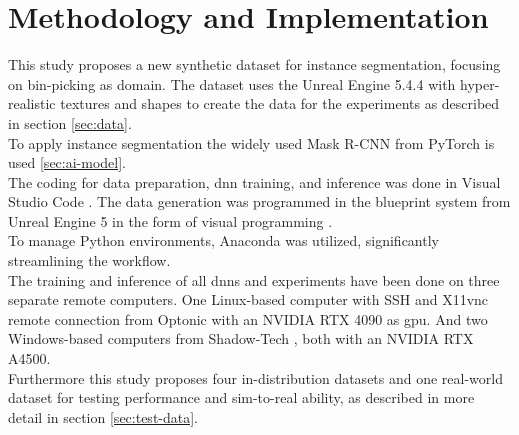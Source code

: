 \chapter{Methodology and Implementation}
\label{chap:kapitel3}
	This study proposes a new synthetic dataset for instance segmentation, focusing on bin-picking as domain. The dataset uses the Unreal Engine 5.4.4 \cite{ue5} with hyper-realistic textures and shapes to create the data for the experiments as described in section \ref{sec:data}.\\
	To apply instance segmentation the widely used Mask R-CNN \cite{Kaiming2017} from PyTorch \cite{pytorch} is used \ref{sec:ai-model}.\\
	The coding for data preparation, \ac{dnn} training, and inference was done in Visual Studio Code \cite{vscode}. The data generation was programmed in the blueprint system from Unreal Engine 5 \cite{ue5} in the form of visual programming \cite{Romero2022}.\\
	To manage Python environments, Anaconda \cite{anaconda} was utilized, significantly streamlining the workflow.\\
	The training and inference of all \ac{dnn}s and experiments have been done on three separate remote computers. One Linux-based computer with SSH and X11vnc remote connection from Optonic \cite{optonic} with an NVIDIA RTX 4090 as \ac{gpu}. And two Windows-based computers from Shadow-Tech \cite{shadow}, both with an NVIDIA RTX A4500.\\
	Furthermore this study proposes four in-distribution datasets and one real-world dataset for testing performance and sim-to-real ability, as described in more detail in section \ref{sec:test-data}.

	
	
	
